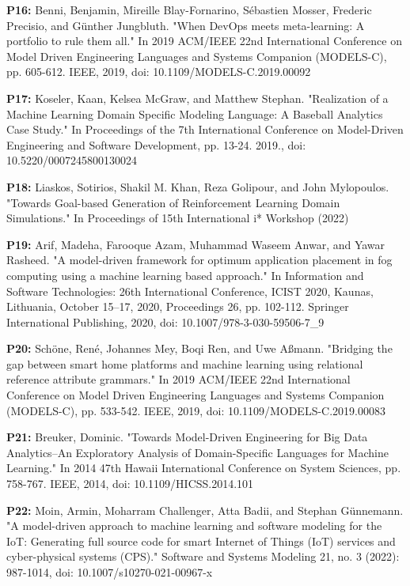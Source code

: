 \begin{footnotesize}
\textbf{P16: } Benni, Benjamin, Mireille Blay-Fornarino, Sébastien Mosser, Frederic Precisio, and Günther Jungbluth. "When DevOps meets meta-learning: A portfolio to rule them all." In 2019 ACM/IEEE 22nd International Conference on Model Driven Engineering Languages and Systems Companion (MODELS-C), pp. 605-612. IEEE, 2019, doi: 10.1109/MODELS-C.2019.00092

\textbf{P17: } Koseler, Kaan, Kelsea McGraw, and Matthew Stephan. "Realization of a Machine Learning Domain Specific Modeling Language: A Baseball Analytics Case Study." In Proceedings of the 7th International Conference on Model-Driven Engineering and Software Development, pp. 13-24. 2019., doi: 10.5220/0007245800130024

\textbf{P18: } Liaskos, Sotirios, Shakil M. Khan, Reza Golipour, and John Mylopoulos. "Towards Goal-based Generation of Reinforcement Learning Domain Simulations."  In Proceedings of 15th International i* Workshop (2022)

\textbf{P19: } Arif, Madeha, Farooque Azam, Muhammad Waseem Anwar, and Yawar Rasheed. "A model-driven framework for optimum application placement in fog computing using a machine learning based approach." In Information and Software Technologies: 26th International Conference, ICIST 2020, Kaunas, Lithuania, October 15–17, 2020, Proceedings 26, pp. 102-112. Springer International Publishing, 2020, doi: 10.1007/978-3-030-59506-7\_9 

\textbf{P20: } Schöne, René, Johannes Mey, Boqi Ren, and Uwe Aßmann. "Bridging the gap between smart home platforms and machine learning using relational reference attribute grammars." In 2019 ACM/IEEE 22nd International Conference on Model Driven Engineering Languages and Systems Companion (MODELS-C), pp. 533-542. IEEE, 2019, doi: 10.1109/MODELS-C.2019.00083

\textbf{P21: } Breuker, Dominic. "Towards Model-Driven Engineering for Big Data Analytics--An Exploratory Analysis of Domain-Specific Languages for Machine Learning." In 2014 47th Hawaii International Conference on System Sciences, pp. 758-767. IEEE, 2014, doi: 10.1109/HICSS.2014.101

\textbf{P22: } Moin, Armin, Moharram Challenger, Atta Badii, and Stephan Günnemann. "A model-driven approach to machine learning and software modeling for the IoT: Generating full source code for smart Internet of Things (IoT) services and cyber-physical systems (CPS)." Software and Systems Modeling 21, no. 3 (2022): 987-1014, doi: 10.1007/s10270-021-00967-x


\end{footnotesize}
